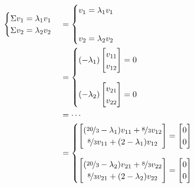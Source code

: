 \documentclass[12pt]{article}
\begin{document}
\begin{enumerate}[leftmargin=\labelsep]
  \begin{equation*}
    \begin{aligned}
      \begin{cases}
        \Sigma v_1 = \lambda_1 v_1 \\
        \Sigma v_2 = \lambda_2 v_2
      \end{cases}
       & = \begin{cases}
              v_1 = \lambda_1 v_1 \\[20pt]
              v_2 = \lambda_2 v_2
           \end{cases}                                                                \\
       & = \begin{cases}
             \left( - \lambda_1 \right) \begin{bmatrix} v_{11} \\ v_{12} \end{bmatrix} = 0 \\[20pt]
             \left( - \lambda_2 \right) \begin{bmatrix} v_{21} \\ v_{22} \end{bmatrix} = 0
           \end{cases} \\
       & = \cdots                                                                                                                     \\
       & = \begin{cases}
             \begin{bmatrix}
          (\nicefrac{20}{3} - \lambda_1) v_{11} + \nicefrac{8}{3} v_{12} \\
          \nicefrac{8}{3} v_{11} + (2 - \lambda_1) v_{12}
        \end{bmatrix} = \begin{bmatrix} 0 \\ 0 \end{bmatrix} \\[20pt]
             \begin{bmatrix}
          (\nicefrac{20}{3} - \lambda_2) v_{21} + \nicefrac{8}{3} v_{22} \\
          \nicefrac{8}{3} v_{21} + (2 - \lambda_2) v_{22}
        \end{bmatrix} = \begin{bmatrix} 0 \\ 0 \end{bmatrix}
           \end{cases}                                                            \\
    \end{aligned}
  \end{equation*}


\end{enumerate}
\end{document}
